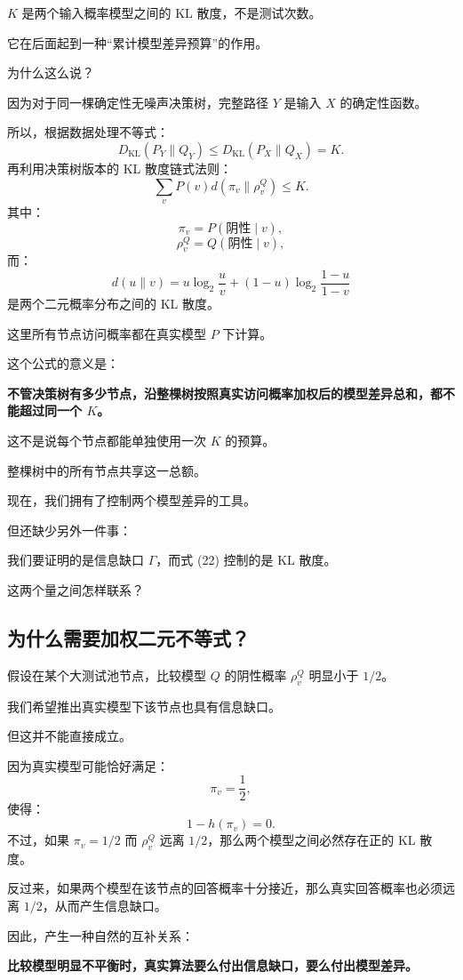 \documentclass[UTF8,11pt]{ctexart}
\begin{document}
$K$ 是两个输入概率模型之间的 KL 散度，不是测试次数。

它在后面起到一种“累计模型差异预算”的作用。

为什么这么说？

因为对于同一棵确定性无噪声决策树，完整路径 $Y$ 是输入 $X$ 的确定性函数。

所以，根据数据处理不等式：
\[D_{\mathrm{KL}}(P_Y\|Q_Y)\le D_{\mathrm{KL}}(P_X\|Q_X)=K.\]
再利用决策树版本的 KL 散度链式法则：
\begin{equation}\boxed{\sum_vP(v)d(\pi_v\|\rho_v^Q)\le K.}\tag{22}\end{equation}
其中：
\[\pi_v=P(\text{阴性}\mid v),\]
\[\rho_v^Q=Q(\text{阴性}\mid v),\]
而：
\[d(u\|v)=u\log_2\frac uv+(1-u)\log_2\frac{1-u}{1-v}\]
是两个二元概率分布之间的 KL 散度。

这里所有节点访问概率都在真实模型 $P$ 下计算。

这个公式的意义是：

\textbf{不管决策树有多少节点，沿整棵树按照真实访问概率加权后的模型差异总和，都不能超过同一个 $K$。}

这不是说每个节点都能单独使用一次 $K$ 的预算。

整棵树中的所有节点共享这一总额。

现在，我们拥有了控制两个模型差异的工具。

但还缺少另外一件事：

我们要证明的是信息缺口 $\Gamma$，而式 (22) 控制的是 KL 散度。

这两个量之间怎样联系？

\subsection{为什么需要加权二元不等式？}
假设在某个大测试池节点，比较模型 $Q$ 的阴性概率 $\rho_v^Q$ 明显小于 $1/2$。

我们希望推出真实模型下该节点也具有信息缺口。

但这并不能直接成立。

因为真实模型可能恰好满足：
\[\pi_v=\frac12,\]
使得：
\[1-h(\pi_v)=0.\]
不过，如果 $\pi_v=1/2$ 而 $\rho_v^Q$ 远离 $1/2$，那么两个模型之间必然存在正的 KL 散度。

反过来，如果两个模型在该节点的回答概率十分接近，那么真实回答概率也必须远离 $1/2$，从而产生信息缺口。

因此，产生一种自然的互补关系：

\textbf{比较模型明显不平衡时，真实算法要么付出信息缺口，要么付出模型差异。}
\end{document}
